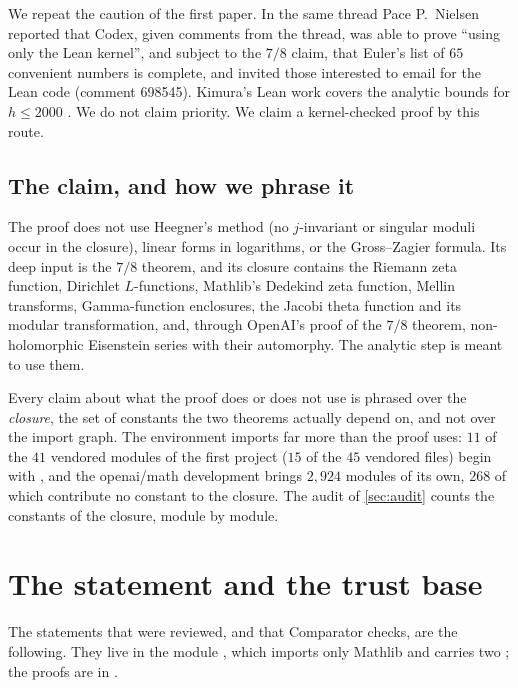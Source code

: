 \documentclass[11pt]{article}
\theoremstyle{definition}
\begin{document}
We repeat the caution of the first paper. In the same thread Pace P.~Nielsen reported that Codex, given comments from the thread, was able to prove ``using only the Lean kernel'', and subject to the $7/8$ claim, that Euler's list of $65$ convenient numbers is complete, and invited those interested to email for the Lean code (comment 698545). Kimura's Lean work covers the analytic bounds for $h \le 2000$ \cite{Kimura2026}. We do not claim priority. We claim a kernel-checked proof by this route.

\subsection{The claim, and how we phrase it}\label{sec:framing}

The proof does not use Heegner's method (no $j$-invariant or singular moduli occur in the closure), linear forms in logarithms, or the Gross--Zagier formula. Its deep input is the $7/8$ theorem, and its closure contains the Riemann zeta function, Dirichlet $L$-functions, Mathlib's Dedekind zeta function, Mellin transforms, Gamma-function enclosures, the Jacobi theta function and its modular transformation, and, through OpenAI's proof of the $7/8$ theorem, non-holomorphic Eisenstein series with their automorphy. The analytic step is meant to use them.

Every claim about what the proof does or does not use is phrased over the \emph{closure}, the set of constants the two theorems actually depend on, and not over the import graph. The environment imports far more than the proof uses: $11$ of the $41$ vendored  modules of the first project ($15$ of the $45$ vendored files) begin with , and the openai/math development brings $2{,}924$ modules of its own, $268$ of which contribute no constant to the closure. The audit of \cref{sec:audit} counts the constants of the closure, module by module.

\section{The statement and the trust base}\label{sec:statement}

The statements that were reviewed, and that Comparator checks, are the following. They live in the module , which imports only Mathlib and carries two ; the proofs are in .
\end{document}
